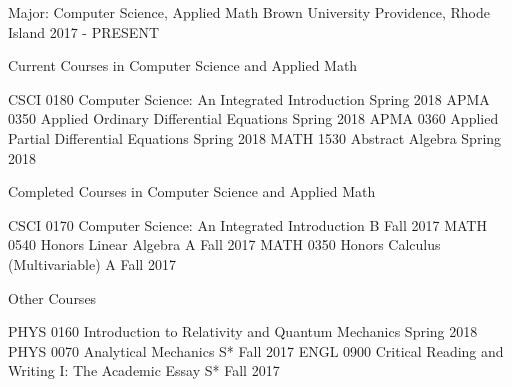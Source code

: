 \begin{cventries}
  \cventry
    {Major: Computer Science, Applied Math}
    {Brown University}
    {Providence, Rhode Island}
    {2017 - PRESENT}
    {
        Current Courses in Computer Science and Applied Math
        \vspace{-0.5em}
        \begin{cvhonors}
            \cvhonor
            {CSCI 0180}
            {Computer Science: An Integrated Introduction}
            {}
            {Spring 2018}
            \cvhonor
            {APMA 0350}
            {Applied Ordinary Differential Equations}
            {}
            {Spring 2018}
            \cvhonor
            {APMA 0360}
            {Applied Partial Differential Equations}
            {}
            {Spring 2018}
            \cvhonor
            {MATH 1530}
            {Abstract Algebra}
            {}
            {Spring 2018}
        \end{cvhonors}
        \vspace{0.5em}
        Completed Courses in Computer Science and Applied Math
        \vspace{-0.5em}
        \begin{cvhonors}
            \cvhonor
            {CSCI 0170}
            {Computer Science: An Integrated Introduction}
            {B}
            {Fall 2017}
            \cvhonor
            {MATH 0540}
            {Honors Linear Algebra}
            {A}
            {Fall 2017}
            \cvhonor
            {MATH 0350}
            {Honors Calculus (Multivariable)}
            {A}
            {Fall 2017}
        \end{cvhonors}
        \vspace{0.5em}
        Other Courses
        \vspace{-0.5em}
        \begin{cvhonors}
            \cvhonor
            {PHYS 0160}
            {Introduction to Relativity and Quantum Mechanics}
            {}
            {Spring 2018}
            \cvhonor
            {PHYS 0070}
            {Analytical Mechanics}
            {S*}
            {Fall 2017}
            \cvhonor
            {ENGL 0900}
            {Critical Reading and Writing I: The Academic Essay}
            {S*}
            {Fall 2017}
        \end{cvhonors}
    }
\end{cventries}

